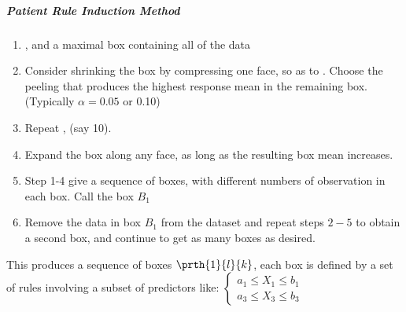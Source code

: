 \subparagraph{Patient Rule Induction Method}
\begin{enumerate}
	\item {}, and a maximal box containing all of the data
	\item Consider shrinking the box by compressing one face, so as to . Choose the peeling that produces the highest
		response mean in the remaining box. (Typically $\alpha=0.05$ or 0.10) 
	\item Repeat , (say 10).
	\item Expand the box along any face, as long as the resulting box mean increases.
	\item Step 1-4 give a sequence of boxes, with different numbers of observation in each
		box.  Call the box
		$B_{1}$
	\item Remove the data in box $B_{1}$ from the dataset and repeat steps $2-5$ to obtain
		a second box, and continue to get as many boxes as desired.
\end{enumerate}
This produces a sequence of boxes $\prth{1}{l}{k}$, each box is defined by a set of rules involving
a subset of predictors like: 
$\begin{cases}
	a_{1}\leq X_{1}\leq b_{1}\\
	a_{3}\leq X_{3}\leq b_{3}
\end{cases}$

